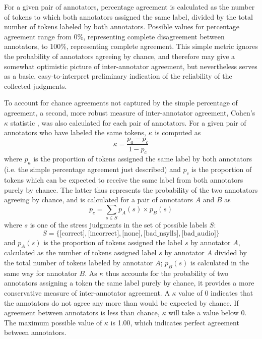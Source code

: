 		
		For a given pair of annotators, percentage agreement is calculated as the number of tokens to which both annotators assigned the same label, divided by the total number of tokens labeled by both annotators. Possible values for percentage agreement range from 0\%, representing complete disagreement between annotators, to 100\%, representing complete agreement. This simple metric ignores the probability of annotators agreeing by chance, and therefore may give a somewhat optimistic picture of inter-annotator agreement, but nevertheless serves as a basic, easy-to-interpret preliminary indication of the reliability of the collected judgments.
		
		To account for chance agreements not captured by the simple percentage of agreement, a second, more robust measure of inter-annotator agreement, Cohen's $\kappa$ statistic \citep{Cohen1960}, was also calculated for each pair of annotators. For a given pair of annotators who have labeled the same tokens, $\kappa$ is computed as
		\[
		\kappa = \frac{p_a-p_c}{1-p_c}
		\]
		where $p_a$ is the proportion of tokens assigned the same label by both annotators (i.e. the simple percentage agreement just described) and $p_c$ is the proportion of tokens which can be expected to receive the same label from both annotators purely by chance. The latter thus represents the probability of the two annotators agreeing by chance, and is calculated for a pair of annotators $A$ and $B$ as
		\[
		p_c = \sum_{s \in S} p_A(s) \times p_B(s)
		\]
		where $s$ is one of the stress judgments in the set of possible labels $S$:
		\[S = \{\text{[correct]}, \text{[incorrect]}, \text{[none]}, \text{[bad\_nsylls]}, \text{[bad\_audio]}\}\]
		and $p_A(s)$ is the proportion of tokens assigned the label $s$ by annotator $A$, calculated as the number of tokens assigned label $s$ by annotator $A$ divided by the total number of tokens labeled by annotator $A$; $p_B(s)$ is calculated in the same way for annotator $B$.
		As $\kappa$ thus accounts for the probability of two annotators assigning a token the same label purely by chance, it provides a more conservative measure of inter-annotator agreement. A $\kappa$ value of 0 indicates that the annotators do not agree any more than would be expected by chance. If agreement between annotators is less than chance, $\kappa$ will take a value below 0. The maximum possible value of $\kappa$ is 1.00, which indicates perfect agreement between annotators.
		

